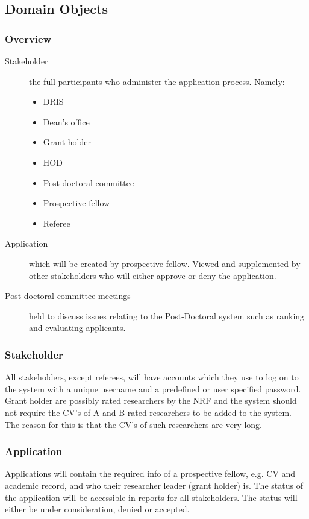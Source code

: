 \documentclass[12pt]{article}
\begin{document}
		\vspace{0.2in}
		
		\subsection{Domain Objects} %
		\subsubsection{Overview}
		\begin{description}
			\item[Stakeholder] the full participants who administer the application process. Namely: 
				\begin{itemize}
					\item DRIS
					\item Dean's office
					\item Grant holder
					\item HOD
					\item Post-doctoral committee
					\item Prospective fellow
					\item Referee
				\end{itemize}
			\item[Application] which will be created by prospective fellow. Viewed and supplemented by other stakeholders who will either approve or deny the application.
			\item[Post-doctoral committee meetings] held to discuss issues relating to the Post-Doctoral system such as ranking and evaluating applicants.
		\end{description}
		\vspace{0.5in}
		\subsubsection{Stakeholder}
		All stakeholders, except referees, will have accounts which they use to log on to the system with a unique username and a predefined or user specified password.\linebreak \linebreak
		Grant holder are possibly rated researchers by the NRF and the system should not require the CV's of A and B rated researchers to be added to the system. The reason for this is that the CV's of such researchers are very long.
		\subsubsection{Application}
		Applications will contain the required info of a prospective fellow, e.g. CV and academic record, and who their researcher leader (grant holder) is. The status of the application will be accessible in reports for all stakeholders. The status will either be under consideration, denied or accepted.
\end{document}
